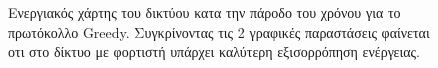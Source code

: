 \begin{figure}[H]
  \centering
  \caption{Ενεργιακός χάρτης του δικτύου κατα την πάροδο του χρόνου για το πρωτόκολλο Greedy. Συγκρίνοντας τις 2 γραφικές παραστάσεις φαίνεται οτι στο δίκτυο με
φορτιστή υπάρχει καλύτερη εξισορρόπηση ενέργειας.}
  \label{fig:1exp_4_1}
\end{figure}

